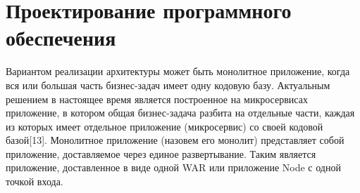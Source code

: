 \section{Проектирование программного обеспечения}

Вариантом реализации архитектуры может быть монолитное приложение, когда вся или большая часть бизнес-задач имеет одну кодовую базу.
Актуальным решением в настоящее время является построенное на микросервисах приложение, в котором общая бизнес-задача разбита на отдельные части, каждая из которых имеет отдельное приложение (микросервис) со своей кодовой базой[13].
\bigbreak
Монолитное приложение (назовем его монолит) представляет собой приложение, доставляемое через единое развертывание.
Таким является приложение, доставленное в виде одной WAR или приложение Node с одной точкой входа.

